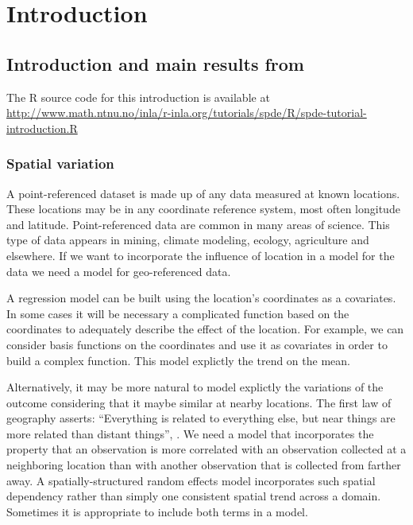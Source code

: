 


\chapter{Introduction}\label{ch:intro}

\section{Introduction and main results from \cite{lindgrenRL:2011}}\label{sec:intro}

The R source code for this introduction is available at  
\url{http://www.math.ntnu.no/inla/r-inla.org/tutorials/spde/R/spde-tutorial-introduction.R}

\subsection{Spatial variation}\label{sec:spatial}

A point-referenced dataset is made up of any 
data measured at known locations. 
These locations may be in any coordinate reference system, 
most often longitude and latitude. 
Point-referenced data are common in 
many areas of science. 
This type of data appears in mining, climate modeling, 
ecology, agriculture and elsewhere. 
If we want to incorporate the influence 
of location in a model for the data 
we need a model for geo-referenced data. 

A regression model can be built using 
the location's coordinates as a covariates. 
In some cases it will be necessary a 
complicated function based on the coordinates to 
adequately describe the effect of the location. 
For example, we can consider basis functions 
on the coordinates and use it as covariates 
in order to build a complex function. 
This model explictly the trend on the mean. 

Alternatively, it may be more natural to model 
explictly the variations of the outcome considering 
that it maybe similar at nearby locations. 
The first law of geography asserts: 
``Everything is related to everything else, 
but near things are more related than distant things'', 
\cite{tobler:1970}. 
We need a model that incorporates the property that an 
observation is more correlated with an observation 
collected at a neighboring location than with another 
observation that is collected from farther away. 
A spatially-structured random effects model 
incorporates such spatial dependency rather than 
simply one consistent spatial trend across a domain. 
Sometimes it is appropriate to include both terms in a model. 

